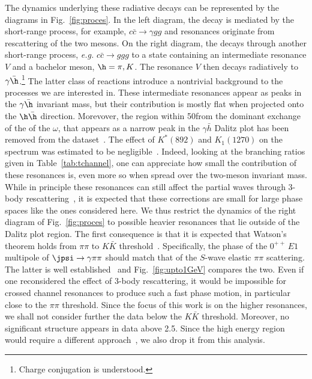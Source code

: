 The dynamics underlying these radiative decays can be represented by the diagrams in Fig.~\ref{fig:proces}. In the left diagram, the \jpsi decay is mediated by the short-range process, for example,  $c\bar c \to \gamma g g$ and resonances originate from rescattering of the two mesons. On the right diagram, the \jpsi decays through another short-range process, {\it e.g.} $c\bar c \to g g g$ to a state containing  an intermediate resonance $V$ and a bachelor meson,  $\h=\pi,K$. The resonance $V$ then decays radiatively to $\gamma \bar \h$.\footnote{Charge conjugation is understood.} 
The latter class of reactions introduce  a nontrivial background to the processes  we are interested in. 
These intermediate resonances appear as peaks in the $\gamma \bar \h$ invariant mass, but their contribution is mostly flat when projected onto the $\h\bar \h$ direction.
Morevover, the region within 50\mev from the dominant  exchange of the of the $\omega$, that appears as a narrow  peak in the $\gamma \bar{h}$ Dalitz plot
 has  been removed from the \pizpiz dataset~\cite{Ablikim:2015umt}. The effect of $K^*(892)$ and $K_1(1270)$ on the \KSKS spectrum was estimated to be negligible~\cite{Ablikim:2018izx}. Indeed,  looking at the branching ratios given in Table~\ref{tab:tchannel}, one can appreciate how small the contribution of these resonances is, even more so when spread over the two-meson invariant mass. While in principle these resonances can still affect the partial waves through 3-body rescattering~\cite{Niecknig:2012sj,*Gan:2020aco,*JPAC:2020umo}, it is expected that these corrections are small for large phase spaces like the ones considered here. 
 We thus restrict the dynamics of the right diagram of Fig.~\ref{fig:proces} to possible heavier resonances that lie outside of the Dalitz plot region.    
The first consequence is that it is expected that  Watson's theorem holds from $\pi\pi$ to $K\bar K$ threshold~\cite{Watson:1952ji}. 
 Specifically, the phase of the $0^{++}\,E1$ multipole of $\jpsi \to \gamma \pi\pi$ should match 
 that of the $S$-wave elastic $\pi\pi$ scattering. The latter is well established~\cite{Hyams:1973zf,Grayer:1974cr,Hyams:1975mc,Cohen:1980cq,Kaminski:1996da,Batley:2010zza,Ananthanarayan:2000ht,Colangelo:2001df,GarciaMartin:2011cn,Moussallam:2011zg,Pelaez:2019eqa} and 
Fig.~\ref{fig:upto1GeV} compares the two. 
Even if one reconsidered the effect of 3-body rescattering, it would be impossible for crossed channel resonances to produce such a fast phase motion, in particular close to the $\pi\pi$ threshold.
Since the focus of this work is on the higher resonances, we shall not consider further  the data below the $K\bar K$ threshold. Moreover, no significant structure appears in data above 2.5\gev. Since the high energy region would require a  different approach~\cite{Bibrzycki:2021rwh}, we also drop it from this analysis. 

